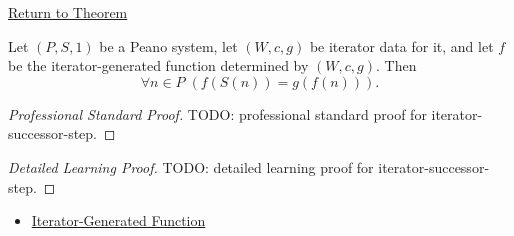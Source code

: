 \newpage
{}
\label{prf:iterator-successor-step}

\begin{remark*}[Return]
\hyperref[thm:iterator-successor-step]{Return to Theorem}
\end{remark*}

\begin{theorem*}
Let $(P,S,1)$ be a Peano system, let $(W,c,g)$ be iterator data for it, and let
$f$ be the iterator-generated function determined by $(W,c,g)$. Then
\[
\forall n\in P\;(f(S(n))=g(f(n))).
\]
\end{theorem*}

\begin{proof}[Professional Standard Proof]
\LRAProofBodyStart
TODO: professional standard proof for iterator-successor-step.
\end{proof}

\begin{proof}[Detailed Learning Proof]
\LRAProofBodyStart
TODO: detailed learning proof for iterator-successor-step.
\end{proof}

\begin{remark*}
\end{remark*}

\begin{dependencies}
\begin{itemize}
  \item \hyperref[def:iterator-generated-function]{Iterator-Generated Function}
\end{itemize}
\end{dependencies}

\clearpage
